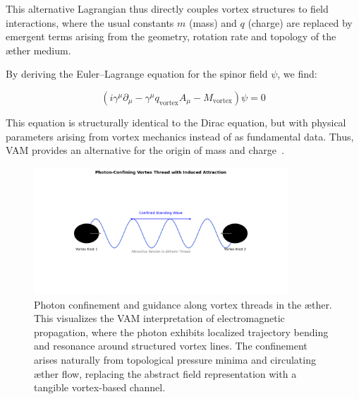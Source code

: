 This alternative Lagrangian thus directly couples vortex structures to field interactions, where the usual constants \( m \) (mass) and \( q \) (charge) are replaced by emergent terms arising from the geometry, rotation rate and topology of the æther medium.

By deriving the Euler–Lagrange equation for the spinor field \( \psi \), we find:

\begin{equation}
    \boxed{ \left( i \gamma^\mu \partial_\mu - \gamma^\mu q_\text{vortex} A_\mu - M_\text{vortex} \right)\psi = 0 }
\end{equation}

This equation is structurally identical to the Dirac equation, but with physical parameters arising from vortex mechanics instead of as fundamental data. Thus, VAM provides an alternative for the origin of mass and charge~\cite{Barcelo2011,Volovik2003}.

\begin{figure}[H]
    \centering
    \includegraphics[width=0.85\textwidth]{08-Photon-ConfiningVortexThreadGravitation}
    \caption{Photon confinement and guidance along vortex threads in the æther. This visualizes the VAM interpretation of electromagnetic propagation, where the photon exhibits localized trajectory bending and resonance around structured vortex lines. The confinement arises naturally from topological pressure minima and circulating æther flow, replacing the abstract field representation with a tangible vortex-based channel.}
    \label{fig:photon_confine}
\end{figure}